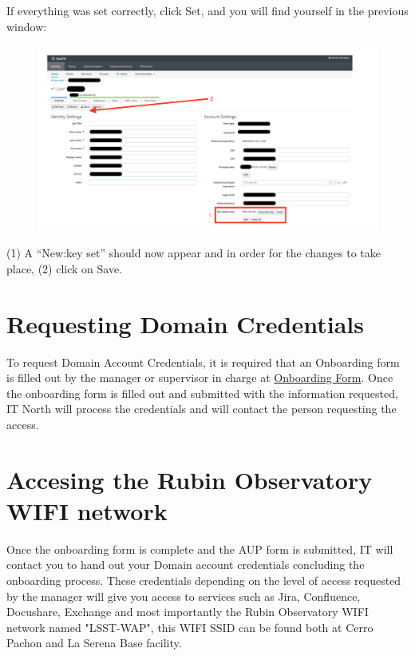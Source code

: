 \newpage

If everything was set correctly, click Set, and you will find yourself in the previous window:

\begin{figure}
  \includegraphics[width=16cm]{Images/example16.png}
\end{figure}

(1) A “New:key set” should now appear and in order for the changes to take place, (2) click on Save.

\newpage

\section{Requesting Domain Credentials}
\label{sec:Domain}

To request Domain Account Credentials, it is required that an Onboarding form is filled out by the manager or supervisor in charge at \href{https://project.lsst.org/onboarding/form}{Onboarding Form}. Once the onboarding form is filled out and submitted with the information requested, IT North will process the credentials and will contact the person requesting the access.

\newpage 

\section{Accesing the Rubin Observatory WIFI network}
  \label{sec:WIFI}
  Once the onboarding form is complete and the AUP form is submitted, IT will contact you to hand out your Domain account credentials concluding the onboarding process. These credentials depending on the level of access requested by the manager will give you access to services such as Jira, Confluence, Docushare, Exchange and most importantly the Rubin Observatory WIFI network named "LSST-WAP", this WIFI SSID can be found both at Cerro Pachon and La Serena Base facility.
  \vspace{180 mm}

